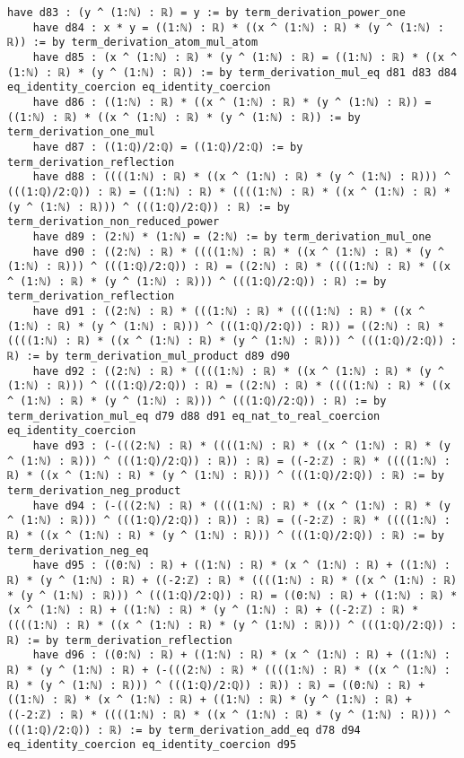 \documentclass{article}
\begin{document}
\begin{tcolorbox}[colback=white!10, width=\linewidth]
\begin{lstlisting}[language=Lean4]
    have d83 : (y ^ (1:ℕ) : ℝ) = y := by term_derivation_power_one
    have d84 : x * y = ((1:ℕ) : ℝ) * ((x ^ (1:ℕ) : ℝ) * (y ^ (1:ℕ) : ℝ)) := by term_derivation_atom_mul_atom
    have d85 : (x ^ (1:ℕ) : ℝ) * (y ^ (1:ℕ) : ℝ) = ((1:ℕ) : ℝ) * ((x ^ (1:ℕ) : ℝ) * (y ^ (1:ℕ) : ℝ)) := by term_derivation_mul_eq d81 d83 d84 eq_identity_coercion eq_identity_coercion
    have d86 : ((1:ℕ) : ℝ) * ((x ^ (1:ℕ) : ℝ) * (y ^ (1:ℕ) : ℝ)) = ((1:ℕ) : ℝ) * ((x ^ (1:ℕ) : ℝ) * (y ^ (1:ℕ) : ℝ)) := by term_derivation_one_mul
    have d87 : ((1:ℚ)/2:ℚ) = ((1:ℚ)/2:ℚ) := by term_derivation_reflection
    have d88 : ((((1:ℕ) : ℝ) * ((x ^ (1:ℕ) : ℝ) * (y ^ (1:ℕ) : ℝ))) ^ (((1:ℚ)/2:ℚ)) : ℝ) = ((1:ℕ) : ℝ) * ((((1:ℕ) : ℝ) * ((x ^ (1:ℕ) : ℝ) * (y ^ (1:ℕ) : ℝ))) ^ (((1:ℚ)/2:ℚ)) : ℝ) := by term_derivation_non_reduced_power
    have d89 : (2:ℕ) * (1:ℕ) = (2:ℕ) := by term_derivation_mul_one
    have d90 : ((2:ℕ) : ℝ) * ((((1:ℕ) : ℝ) * ((x ^ (1:ℕ) : ℝ) * (y ^ (1:ℕ) : ℝ))) ^ (((1:ℚ)/2:ℚ)) : ℝ) = ((2:ℕ) : ℝ) * ((((1:ℕ) : ℝ) * ((x ^ (1:ℕ) : ℝ) * (y ^ (1:ℕ) : ℝ))) ^ (((1:ℚ)/2:ℚ)) : ℝ) := by term_derivation_reflection
    have d91 : ((2:ℕ) : ℝ) * (((1:ℕ) : ℝ) * ((((1:ℕ) : ℝ) * ((x ^ (1:ℕ) : ℝ) * (y ^ (1:ℕ) : ℝ))) ^ (((1:ℚ)/2:ℚ)) : ℝ)) = ((2:ℕ) : ℝ) * ((((1:ℕ) : ℝ) * ((x ^ (1:ℕ) : ℝ) * (y ^ (1:ℕ) : ℝ))) ^ (((1:ℚ)/2:ℚ)) : ℝ) := by term_derivation_mul_product d89 d90
    have d92 : ((2:ℕ) : ℝ) * ((((1:ℕ) : ℝ) * ((x ^ (1:ℕ) : ℝ) * (y ^ (1:ℕ) : ℝ))) ^ (((1:ℚ)/2:ℚ)) : ℝ) = ((2:ℕ) : ℝ) * ((((1:ℕ) : ℝ) * ((x ^ (1:ℕ) : ℝ) * (y ^ (1:ℕ) : ℝ))) ^ (((1:ℚ)/2:ℚ)) : ℝ) := by term_derivation_mul_eq d79 d88 d91 eq_nat_to_real_coercion eq_identity_coercion
    have d93 : (-(((2:ℕ) : ℝ) * ((((1:ℕ) : ℝ) * ((x ^ (1:ℕ) : ℝ) * (y ^ (1:ℕ) : ℝ))) ^ (((1:ℚ)/2:ℚ)) : ℝ)) : ℝ) = ((-2:ℤ) : ℝ) * ((((1:ℕ) : ℝ) * ((x ^ (1:ℕ) : ℝ) * (y ^ (1:ℕ) : ℝ))) ^ (((1:ℚ)/2:ℚ)) : ℝ) := by term_derivation_neg_product
    have d94 : (-(((2:ℕ) : ℝ) * ((((1:ℕ) : ℝ) * ((x ^ (1:ℕ) : ℝ) * (y ^ (1:ℕ) : ℝ))) ^ (((1:ℚ)/2:ℚ)) : ℝ)) : ℝ) = ((-2:ℤ) : ℝ) * ((((1:ℕ) : ℝ) * ((x ^ (1:ℕ) : ℝ) * (y ^ (1:ℕ) : ℝ))) ^ (((1:ℚ)/2:ℚ)) : ℝ) := by term_derivation_neg_eq
    have d95 : ((0:ℕ) : ℝ) + ((1:ℕ) : ℝ) * (x ^ (1:ℕ) : ℝ) + ((1:ℕ) : ℝ) * (y ^ (1:ℕ) : ℝ) + ((-2:ℤ) : ℝ) * ((((1:ℕ) : ℝ) * ((x ^ (1:ℕ) : ℝ) * (y ^ (1:ℕ) : ℝ))) ^ (((1:ℚ)/2:ℚ)) : ℝ) = ((0:ℕ) : ℝ) + ((1:ℕ) : ℝ) * (x ^ (1:ℕ) : ℝ) + ((1:ℕ) : ℝ) * (y ^ (1:ℕ) : ℝ) + ((-2:ℤ) : ℝ) * ((((1:ℕ) : ℝ) * ((x ^ (1:ℕ) : ℝ) * (y ^ (1:ℕ) : ℝ))) ^ (((1:ℚ)/2:ℚ)) : ℝ) := by term_derivation_reflection
    have d96 : ((0:ℕ) : ℝ) + ((1:ℕ) : ℝ) * (x ^ (1:ℕ) : ℝ) + ((1:ℕ) : ℝ) * (y ^ (1:ℕ) : ℝ) + (-(((2:ℕ) : ℝ) * ((((1:ℕ) : ℝ) * ((x ^ (1:ℕ) : ℝ) * (y ^ (1:ℕ) : ℝ))) ^ (((1:ℚ)/2:ℚ)) : ℝ)) : ℝ) = ((0:ℕ) : ℝ) + ((1:ℕ) : ℝ) * (x ^ (1:ℕ) : ℝ) + ((1:ℕ) : ℝ) * (y ^ (1:ℕ) : ℝ) + ((-2:ℤ) : ℝ) * ((((1:ℕ) : ℝ) * ((x ^ (1:ℕ) : ℝ) * (y ^ (1:ℕ) : ℝ))) ^ (((1:ℚ)/2:ℚ)) : ℝ) := by term_derivation_add_eq d78 d94 eq_identity_coercion eq_identity_coercion d95

\end{lstlisting}
\end{tcolorbox}
\end{document}
